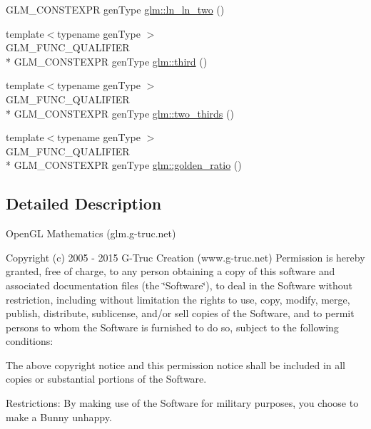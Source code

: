 \begin{DoxyCompactItemize}
G\-L\-M\-\_\-\-C\-O\-N\-S\-T\-E\-X\-P\-R gen\-Type \hyperlink{group__gtc__constants_gaca94292c839ed31a405ab7a81ae7e850}{glm\-::ln\-\_\-ln\-\_\-two} ()
\item 
{\footnotesize template$<$typename gen\-Type $>$ }\\G\-L\-M\-\_\-\-F\-U\-N\-C\-\_\-\-Q\-U\-A\-L\-I\-F\-I\-E\-R \\*
G\-L\-M\-\_\-\-C\-O\-N\-S\-T\-E\-X\-P\-R gen\-Type \hyperlink{group__gtc__constants_ga3077c6311010a214b69ddc8214ec13b5}{glm\-::third} ()
\item 
{\footnotesize template$<$typename gen\-Type $>$ }\\G\-L\-M\-\_\-\-F\-U\-N\-C\-\_\-\-Q\-U\-A\-L\-I\-F\-I\-E\-R \\*
G\-L\-M\-\_\-\-C\-O\-N\-S\-T\-E\-X\-P\-R gen\-Type \hyperlink{group__gtc__constants_ga9b4d2f4322edcf63a6737b92a29dd1f5}{glm\-::two\-\_\-thirds} ()
\item 
{\footnotesize template$<$typename gen\-Type $>$ }\\G\-L\-M\-\_\-\-F\-U\-N\-C\-\_\-\-Q\-U\-A\-L\-I\-F\-I\-E\-R \\*
G\-L\-M\-\_\-\-C\-O\-N\-S\-T\-E\-X\-P\-R gen\-Type \hyperlink{group__gtc__constants_ga748cf8642830657c5b7eae04d0a80899}{glm\-::golden\-\_\-ratio} ()
\end{DoxyCompactItemize}


\subsection{Detailed Description}
Open\-G\-L Mathematics (glm.\-g-\/truc.\-net)

Copyright (c) 2005 -\/ 2015 G-\/\-Truc Creation (www.\-g-\/truc.\-net) Permission is hereby granted, free of charge, to any person obtaining a copy of this software and associated documentation files (the \char`\"{}\-Software\char`\"{}), to deal in the Software without restriction, including without limitation the rights to use, copy, modify, merge, publish, distribute, sublicense, and/or sell copies of the Software, and to permit persons to whom the Software is furnished to do so, subject to the following conditions\-:

The above copyright notice and this permission notice shall be included in all copies or substantial portions of the Software.

Restrictions\-: By making use of the Software for military purposes, you choose to make a Bunny unhappy.

